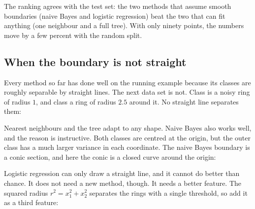 The ranking agrees with the test set: the two methods that assume smooth
boundaries (naive Bayes and logistic regression) beat the two that can fit
anything (one neighbour and a full tree). With only ninety points, the numbers
move by a few percent with the random split.

\subsection{When the boundary is not straight}
\label{ssec:ml-rings}

Every method so far has done well on the running example because its classes are
roughly separable by straight lines. The next data set is not. Class
 is a noisy ring of radius \(1\), and class  a ring of
radius \(2.5\) around it. No straight line separates them:

\begin{codepairs}
\end{codepairs}

Nearest neighbours and the tree adapt to any shape. Naive Bayes also works well,
and the reason is instructive. Both classes are centred at the origin, but the
outer class has a much larger variance in each coordinate. The naive Bayes
boundary is a conic section, and here the conic is a closed curve around the
origin:


Logistic regression can only draw a straight line, and it cannot do better than
chance. It does not need a new method, though. It needs a better feature. The
squared radius \(r^2 = x_1^2 + x_2^2\) separates the rings with a single threshold,
so add it as a third feature:

\begin{codepairs}
\end{codepairs}

